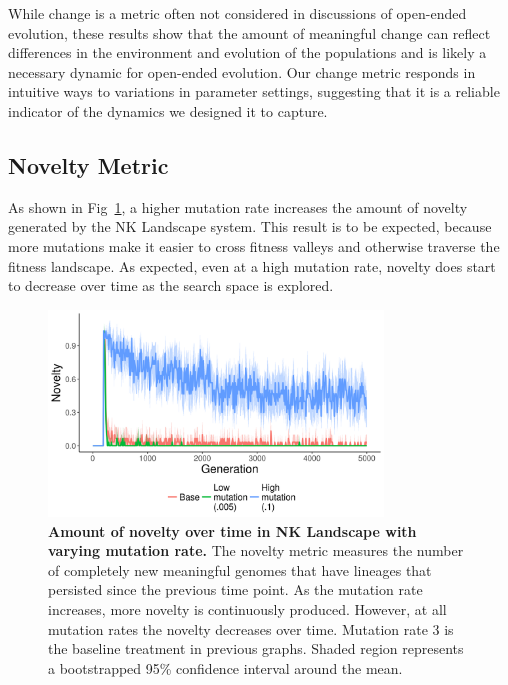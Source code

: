 \documentclass[letterpaper]{article}
\begin{document}
While change is a metric often not considered in discussions of open-ended evolution, these results show that the amount of meaningful change can reflect differences in the environment and evolution of the populations and is likely a necessary dynamic for open-ended evolution. Our change metric responds in intuitive ways to variations in parameter settings, suggesting that it is a reliable indicator of the dynamics we designed it to capture. 

\subsection{Novelty Metric}
As shown in Fig~\ref{novelty_time}, a higher mutation rate increases the amount of novelty generated by the NK Landscape system. This result is to be expected, because more mutations make it easier to cross fitness valleys and otherwise traverse the fitness landscape. As expected, even at a high mutation rate, novelty does start to decrease over time as the search space is explored.

\begin{figure}
\includegraphics[width=3.5in]{figs/novelty_mean_mut_rate.png}
\caption{\textbf{Amount of novelty over time in NK Landscape with varying mutation rate.} The novelty metric measures the number of completely new meaningful genomes that have lineages that persisted since the previous time point. As the mutation rate increases, more novelty is continuously produced. However, at all mutation rates the novelty decreases over time. Mutation rate 3 is the baseline treatment in previous graphs. Shaded region represents a bootstrapped 95\% confidence interval around the mean.}
\label{novelty_time}
\end{figure}
\end{document}
